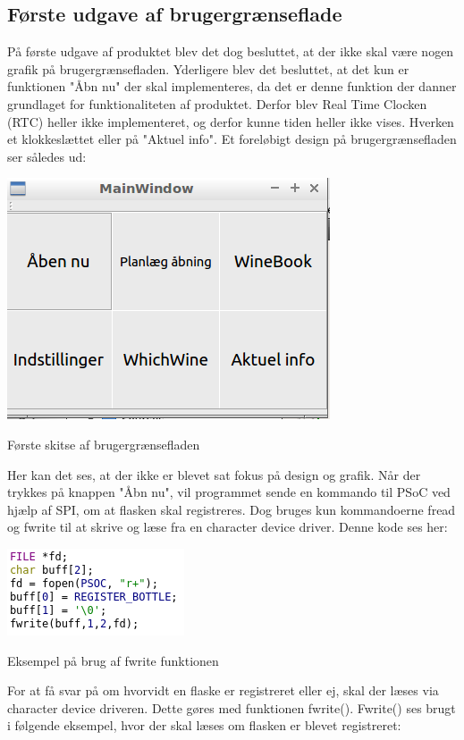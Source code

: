\subsection*{Første udgave af brugergrænseflade}
På første udgave af produktet blev det dog besluttet, at der ikke skal være nogen grafik på brugergrænsefladen. Yderligere blev det besluttet, at det kun er funktionen "Åbn nu" der skal implementeres, da det er denne funktion der danner grundlaget for funktionaliteten af produktet. Derfor blev Real Time Clocken  (RTC) heller ikke implementeret, og derfor kunne tiden heller ikke vises. Hverken et klokkeslættet eller på "Aktuel info".
Et foreløbigt design på brugergrænsefladen ser således ud:

\includegraphics{Billeder/real_skitse}
\caption{Første skitse af brugergrænsefladen}

Her kan det ses, at der ikke er blevet sat fokus på design og grafik. Når der trykkes på knappen "Åbn nu", vil programmet sende en kommando til PSoC ved hjælp af SPI, om at flasken skal registreres. Dog bruges kun kommandoerne fread og fwrite til at skrive og læse fra en character device driver. Denne kode ses her:

\includegraphics{Billeder/write}
\caption{Eksempel på brug af fwrite funktionen}

For at få svar på om hvorvidt en flaske er registreret eller ej, skal der læses via character device driveren. Dette gøres med funktionen fwrite(). Fwrite() ses brugt i følgende eksempel, hvor der skal læses om flasken er blevet registreret:

